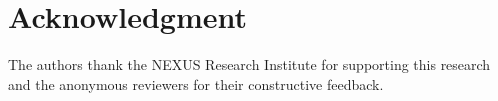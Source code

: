 \documentclass[conference]{IEEEtran}
\begin{document}
\section*{Acknowledgment}
The authors thank the NEXUS Research Institute for supporting this research and the anonymous reviewers for their constructive feedback.

\balance


\end{document}

